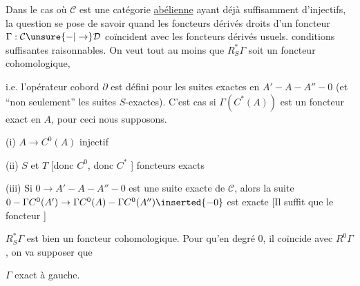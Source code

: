 
Dans le cas où $\mathcal C$ est une catégorie \uline{abélienne} ayant déjà suffisamment d'injectifs, la question se pose de savoir quand les foncteurs dérivés droits  d'un foncteur $\Gamma:\mathcal C\unsure{-|\to}\mathcal D$ coïncident avec les foncteurs dérivés usuels.   conditions suffisantes raisonnables. On veut tout au moins que $R_S^*\Gamma$ soit un foncteur cohomologique,


i.e. l'opérateur cobord $\partial$ est défini pour \uline{} les suites exactes en $A'-A-A''-0$ (et ``non seulement'' les suites $S$-exactes). C'est  cas si $\Gamma(C^*(A))$ est un foncteur exact en $A$, pour ceci nous supposons.


(i) $A\to C^0(A)$ injectif

(ii) $S$ et $T$ [donc $C^0$, donc  $C^*$ ] foncteurs exacts

(iii) Si $0\to A'-A-A''-0$ est une suite exacte de $\mathcal C$, alors la suite $0-\Gamma C^0(A')\to\Gamma C^0(A)-\Gamma C^0(A'')\inserted{-0}$ est exacte [Il suffit que le foncteur ]

  $R^*_S\Gamma$ est bien un foncteur cohomologique. Pour qu'en degré $0$, il coïncide avec $R^0\Gamma$, on va supposer que

  $\Gamma$ exact à gauche.

